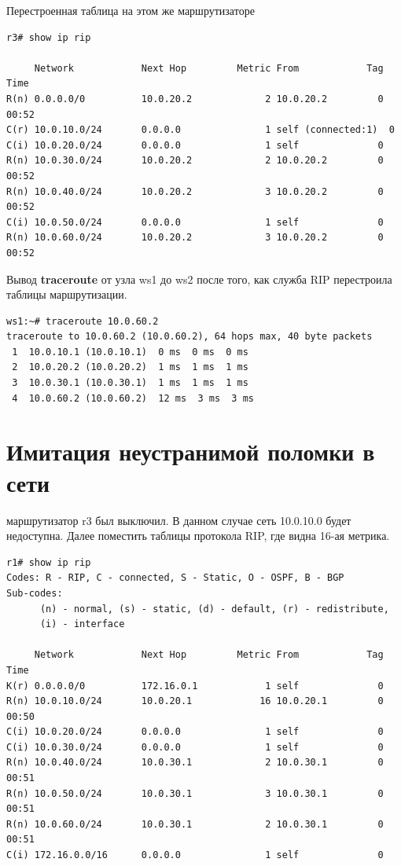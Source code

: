 \documentclass[a4paper,12pt]{article}
\begin{document}
Перестроенная таблица на этом же маршрутизаторе

\begin{Verbatim}
r3# show ip rip

     Network            Next Hop         Metric From            Tag Time
R(n) 0.0.0.0/0          10.0.20.2             2 10.0.20.2         0 00:52
C(r) 10.0.10.0/24       0.0.0.0               1 self (connected:1)  0
C(i) 10.0.20.0/24       0.0.0.0               1 self              0
R(n) 10.0.30.0/24       10.0.20.2             2 10.0.20.2         0 00:52
R(n) 10.0.40.0/24       10.0.20.2             3 10.0.20.2         0 00:52
C(i) 10.0.50.0/24       0.0.0.0               1 self              0
R(n) 10.0.60.0/24       10.0.20.2             3 10.0.20.2         0 00:52

\end{Verbatim}

Вывод \textbf{traceroute} от узла ws1 до ws2 после того, как служба RIP перестроила таблицы маршрутизации.

\begin{Verbatim}
ws1:~# traceroute 10.0.60.2
traceroute to 10.0.60.2 (10.0.60.2), 64 hops max, 40 byte packets
 1  10.0.10.1 (10.0.10.1)  0 ms  0 ms  0 ms
 2  10.0.20.2 (10.0.20.2)  1 ms  1 ms  1 ms
 3  10.0.30.1 (10.0.30.1)  1 ms  1 ms  1 ms
 4  10.0.60.2 (10.0.60.2)  12 ms  3 ms  3 ms
\end{Verbatim}

\section{Имитация неустранимой поломки в сети}

маршрутизатор r3 был выключил. В данном случае сеть 10.0.10.0 будет недоступна.
Далее поместить таблицы протокола RIP, где видна 16-ая метрика.

\begin{Verbatim}
r1# show ip rip
Codes: R - RIP, C - connected, S - Static, O - OSPF, B - BGP
Sub-codes:
      (n) - normal, (s) - static, (d) - default, (r) - redistribute,
      (i) - interface

     Network            Next Hop         Metric From            Tag Time
K(r) 0.0.0.0/0          172.16.0.1            1 self              0
R(n) 10.0.10.0/24       10.0.20.1            16 10.0.20.1         0 00:50
C(i) 10.0.20.0/24       0.0.0.0               1 self              0
C(i) 10.0.30.0/24       0.0.0.0               1 self              0
R(n) 10.0.40.0/24       10.0.30.1             2 10.0.30.1         0 00:51
R(n) 10.0.50.0/24       10.0.30.1             3 10.0.30.1         0 00:51
R(n) 10.0.60.0/24       10.0.30.1             2 10.0.30.1         0 00:51
C(i) 172.16.0.0/16      0.0.0.0               1 self              0
\end{Verbatim}
\end{document}
